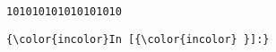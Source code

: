 \documentclass[11pt]{article}
\begin{document}
    \begin{Verbatim}[commandchars=\\\{\}]
101010101010101010
    \end{Verbatim}

    \begin{Verbatim}[commandchars=\\\{\}]
{\color{incolor}In [{\color{incolor} }]:} 
\end{Verbatim}


    
    
    
    
\end{document}
